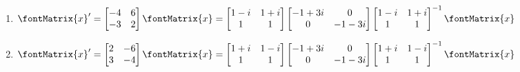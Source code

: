 \begin{enumerate}[label=(\alph*)]
\item\label{itm : Quiz20 e} $\displaystyle \fontMatrix{x}' = \begin{bmatrix}-4&6\\-3&2\end{bmatrix} \fontMatrix{x} = \begin{bmatrix}1 - i&1 + i\\1&1\end{bmatrix} \begin{bmatrix}-1 + 3 i&0\\0&-1 - 3 i\end{bmatrix} \begin{bmatrix}1 - i& 1 + i\\1&1\end{bmatrix}^{-1} \fontMatrix{x}$
\item\label{itm : Quiz20 f} $\displaystyle \fontMatrix{x}' = \begin{bmatrix}2&-6\\3&-4\end{bmatrix} \fontMatrix{x} = \begin{bmatrix}1 + i&1 - i\\1&1\end{bmatrix} \begin{bmatrix}-1 + 3 i&0\\0&-1 - 3 i\end{bmatrix} \begin{bmatrix}1 + i& 1 - i\\1&1\end{bmatrix}^{-1} \fontMatrix{x}$
\end{enumerate}

